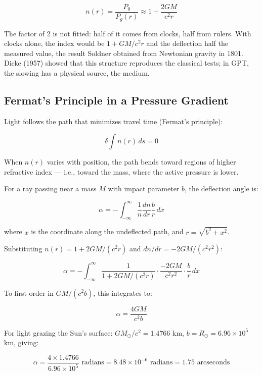 \documentclass[12pt, a4paper]{article}
\begin{document}
\[
n(r) = \frac{P_0}{P_g(r)} \approx 1 + \frac{2GM}{c^2 r}
\]

The factor of 2 is not fitted: half of it comes from clocks, half from rulers. With clocks alone, the index would be \( 1 + GM/c^2 r \) and the deflection half the measured value, the result Soldner obtained from Newtonian gravity in 1801. Dicke (1957) showed that this structure reproduces the classical tests; in GPT, the slowing has a physical source, the medium. 

\subsection{Fermat's Principle in a Pressure Gradient}
\label{subsec:fermat_principle}

Light follows the path that minimizes travel time (Fermat's principle):

\[
\delta \int n(r) \, ds = 0
\]

When \( n(r) \) varies with position, the path bends toward regions of higher refractive index — i.e., toward the mass, where the active pressure is lower.

For a ray passing near a mass \( M \) with impact parameter \( b \), the deflection angle is:

\[
\alpha = -\int_{-\infty}^{\infty} \frac{1}{n} \frac{dn}{dr} \frac{b}{r} \, dx
\]

where \( x \) is the coordinate along the undeflected path, and \( r = \sqrt{b^2 + x^2} \).

Substituting \( n(r) = 1 + 2GM/(c^2 r) \) and \( dn/dr = -2GM/(c^2 r^2) \):

\[
\alpha = -\int_{-\infty}^{\infty} \frac{1}{1 + 2GM/(c^2 r)} \cdot \frac{-2GM}{c^2 r^2} \cdot \frac{b}{r} \, dx
\]

To first order in \( GM/(c^2 b) \), this integrates to:

\[
\alpha = \frac{4GM}{c^2 b}
\]

For light grazing the Sun's surface: \( GM_\odot/c^2 = 1.4766 \) km, \( b = R_\odot = 6.96 \times 10^5 \) km, giving:

\[
\alpha = \frac{4 \times 1.4766}{6.96 \times 10^5} \text{ radians} = 8.48 \times 10^{-6} \text{ radians} = 1.75 \text{ arcseconds}
\]
\end{document}
